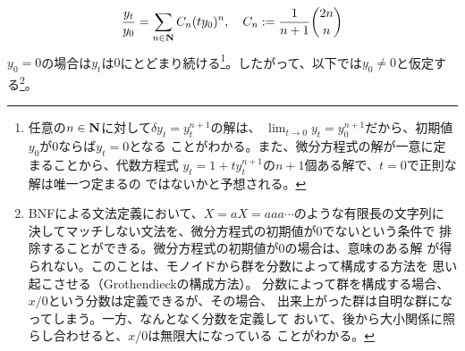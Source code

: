 {\begin{equation*}
\begin{split}
		\frac{y_t}{y_0} = \sum_{n\in\mathbf{N}} C_n(ty_0)^n
		,\quad C_n := \frac{1}{n+1}\binom{2n}{n}
	\end{split}\end{equation*}
	$y_0=0$の場合は$y_t$は$0$にとどまり続ける\footnote{
		任意の$n\in\mathbf{N}$に対して$\delta y_t=y_t^{n+1}$の解は、
		$\lim_{t\to0}y_t=y_0^{n+1}$だから、初期値$y_0$が$0$ならば$y_t=0$となる
		ことがわかる。また、微分方程式の解が一意に定まることから、代数方程式
		$y_t=1+ty_t^{n+1}$の$n+1$個ある解で、$t=0$で正則な解は唯一つ定まるの
		ではないかと予想される。
	}。したがって、以下では$y_0\neq0$と仮定する\footnote{
		BNFによる文法定義において、$X=aX=aaa\cdots$のような有限長の文字列に
		決してマッチしない文法を、微分方程式の初期値が$0$でないという条件で
		排除することができる。微分方程式の初期値が$0$の場合は、意味のある解
		が得られない。このことは、モノイドから群を分数によって構成する方法を
		思い起こさせる（Grothendieckの構成方法）。
		分数によって群を構成する場合、$x/0$という分数は定義できるが、その場合、
		出来上がった群は自明な群になってしまう。一方、なんとなく分数を定義して
		おいて、後から大小関係に照らし合わせると、$x/0$は無限大になっている
		ことがわかる。
	}。

}
